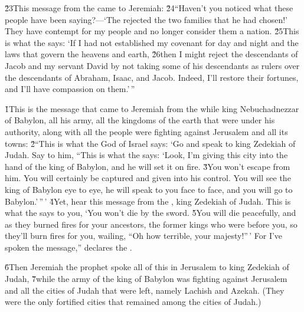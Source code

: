 \v{23}This message from the  came to Jeremiah: \v{24}``Haven't you noticed what these people have been saying?---`The  rejected the two families that he had chosen!' They have contempt for my people and no longer consider them a nation. \v{25}This is what the  says: `If I had not established my covenant for day and night and the laws that govern the heavens and earth, \v{26}then I might reject the descendants of Jacob and my servant David by not taking some of his descendants as rulers over the descendants of Abraham, Isaac, and Jacob. Indeed, I'll restore their fortunes, and I'll have compassion on them.'\,''

\v{1}This is the message that came to Jeremiah from the  while king Nebuchadnezzar of Babylon, all his army, all the kingdoms of the earth that were under his authority, along with all the people were fighting against Jerusalem and all its towns: \v{2}``This is what the  God of Israel says: `Go and speak to king Zedekiah of Judah. Say to him, ``This is what the  says: `Look, I'm giving this city into the hand of the king of Babylon, and he will set it on fire. \v{3}You won't escape from him. You will certainly be captured and given into his control. You will see the king of Babylon eye to eye, he will speak to you face to face, and you will go to Babylon.'\,''\,' \v{4}Yet, hear this message from the , king Zedekiah of Judah. This is what the  says to you, `You won't die by the sword. \v{5}You will die peacefully, and as they burned fires for your ancestors, the former kings who were before you, so they'll burn fires for you, wailing, ``Oh how terrible, your majesty!''\,' For I've spoken the message,'' declares the .

\v{6}Then Jeremiah the prophet spoke all of this in Jerusalem to king Zedekiah of Judah, \v{7}while the army of the king of Babylon was fighting against Jerusalem and all the cities of Judah that were left, namely Lachish and Azekah. (They were the only fortified cities that remained among the cities of Judah.)

